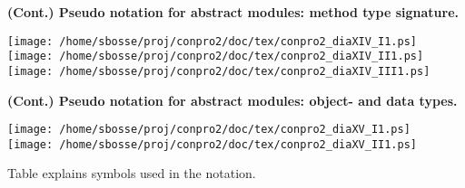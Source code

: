 \documentclass[a4paper,12pt,twoside,english]{article}
\begin{document}
\def\defcontent{
\begin{center}
\texttt{[image: /home/sbosse/proj/conpro2/doc/tex/conpro2\_diaXIV\_I1.ps]}\\\vskip3pt
\texttt{[image: /home/sbosse/proj/conpro2/doc/tex/conpro2\_diaXIV\_II1.ps]}\\\vskip3pt
\texttt{[image: /home/sbosse/proj/conpro2/doc/tex/conpro2\_diaXIV\_III1.ps]}\\\vskip3pt
\end{center}
}
\def\defdescription{
\caption{\bf (Cont.) Pseudo notation for abstract modules: method type signature.  
}
\label{def:14}}
\begin{definition}[H]\let\normalsize\footnotesize \normalsize
\defdescription
\end{definition}
\defcontent
\def\defcontent{
\begin{center}
\texttt{[image: /home/sbosse/proj/conpro2/doc/tex/conpro2\_diaXV\_I1.ps]}\\\vskip3pt
\texttt{[image: /home/sbosse/proj/conpro2/doc/tex/conpro2\_diaXV\_II1.ps]}\\\vskip3pt
\end{center}
}
\def\defdescription{
\caption{\bf (Cont.) Pseudo notation for abstract modules: object- and data types.
}
\label{def:15}}
\begin{definition}[H]\let\normalsize\footnotesize \normalsize
\defdescription
\end{definition}
\defcontent
Table  explains symbols used in the notation.


\vskip5pt
\end{document}
